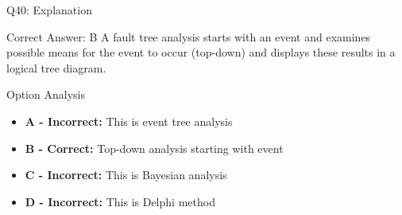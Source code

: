 \documentclass{beamer}
\begin{document}
	\begin{frame}{Q40: Explanation}
		\begin{block}{Correct Answer: B}
			A fault tree analysis starts with an event and examines possible means for the event to occur (top-down) and displays these results in a logical tree diagram.
		\end{block}
		\begin{block}{Option Analysis}
			\begin{itemize}
				\item \textbf{A - Incorrect:} This is event tree analysis
				\item \textbf{B - Correct:} Top-down analysis starting with event
				\item \textbf{C - Incorrect:} This is Bayesian analysis
				\item \textbf{D - Incorrect:} This is Delphi method
			\end{itemize}
		\end{block}
	\end{frame}
	
	
	
\end{document}
